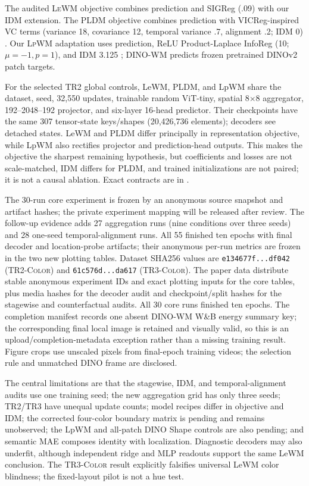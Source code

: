 \documentclass{article}
\newcommand{\trtwo}{\textsc{TR2-Color}}
\newcommand{\trthree}{\textsc{TR3-Color}}
\newcommand{\lewm}{\textsc{LeWM}}
\newcommand{\pldm}{\textsc{PLDM}}
\newcommand{\lpwm}{\textsc{LpWM}}
\newcommand{\dinowm}{\textsc{DINO-WM}}
\begin{document}
The audited \lewm{} objective combines prediction and SIGReg (.09)
\citep{balestriero2025lejepa,maes2026leworldmodel} with our IDM extension.
The \pldm{} objective combines prediction with VICReg-inspired VC terms
(variance 18, covariance 12, temporal variance .7, alignment .2; IDM 0)
\citep{bardes2022vicreg,sobal2025latentplanning}.  Our \lpwm{} adaptation uses
prediction, ReLU Product-Laplace InfoReg (10; $\mu=-1,p=1$), and IDM 3.125
\citep{kuang2026rectified}; \dinowm{} predicts frozen pretrained DINOv2 patch
targets.

For the selected TR2 global controls, LeWM, PLDM, and LpWM share the dataset,
seed, 32,550 updates, trainable random ViT-tiny, spatial 8$\times$8 aggregator,
192--2048--192 projector, and six-layer 16-head predictor.  Their checkpoints
have the same 307 tensor-state keys/shapes (20,426,736 elements); decoders see
detached states.  LeWM and PLDM differ principally in representation objective,
while LpWM also rectifies projector and prediction-head outputs.  This makes
the objective the sharpest remaining hypothesis, but coefficients and losses
are not scale-matched, IDM differs for PLDM, and trained initializations are not
paired; it is not a causal ablation.  Exact contracts are in
.

The 30-run core experiment is frozen by an anonymous source snapshot and
artifact hashes; the private experiment mapping will be released after review.
The follow-up evidence adds 27 aggregation runs (nine conditions over three
seeds) and 28 one-seed temporal-alignment runs.  All 55 finished ten epochs
with final decoder and
location-probe artifacts; their anonymous per-run metrics are frozen in the two
new plotting tables.
Dataset SHA256 values are
\texttt{e134677f...df042} (\trtwo{}) and
\texttt{61c576d...da617} (\trthree{}).  The paper data distribute stable
anonymous experiment IDs and exact plotting inputs for the core tables, plus
media hashes for the decoder audit and checkpoint/split hashes for the
stagewise and counterfactual audits.  All 30 core runs finished ten epochs.
The completion manifest records one absent DINO-WM W\&B energy summary key;
the corresponding final local image is retained and visually valid, so this is
an upload/completion-metadata exception rather than a missing training result.
Figure crops use unscaled pixels from final-epoch training videos; the selection rule and
unmatched DINO frame are disclosed.

The central limitations are that the stagewise, IDM, and temporal-alignment
audits use one training seed; the new aggregation grid has only three seeds;
TR2/TR3 have unequal update counts; model recipes differ in objective and IDM;
the corrected four-color boundary matrix is pending and remains unobserved;
the LpWM and all-patch DINO Shape controls are also pending;
and semantic MAE
composes identity with localization.  Diagnostic decoders may
also underfit, although independent ridge and MLP readouts support the same
LeWM conclusion.  The \trthree{} result explicitly falsifies universal LeWM
color blindness; the fixed-layout pilot is not a hue test.
\end{document}
